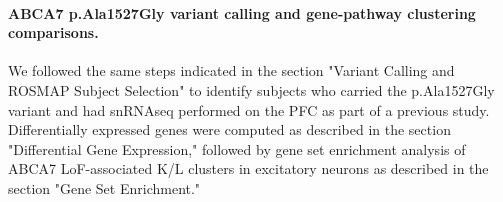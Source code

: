 \paragraph{ABCA7 p.Ala1527Gly variant calling and gene-pathway clustering comparisons.}
We followed the same steps indicated in the section "Variant Calling and ROSMAP Subject Selection" to identify subjects who carried the p.Ala1527Gly variant and had snRNAseq performed on the PFC as part of a previous study. Differentially expressed genes were computed as described in the section "Differential Gene Expression," followed by gene set enrichment analysis of ABCA7 LoF-associated K/L clusters in excitatory neurons as described in the section "Gene Set Enrichment."

